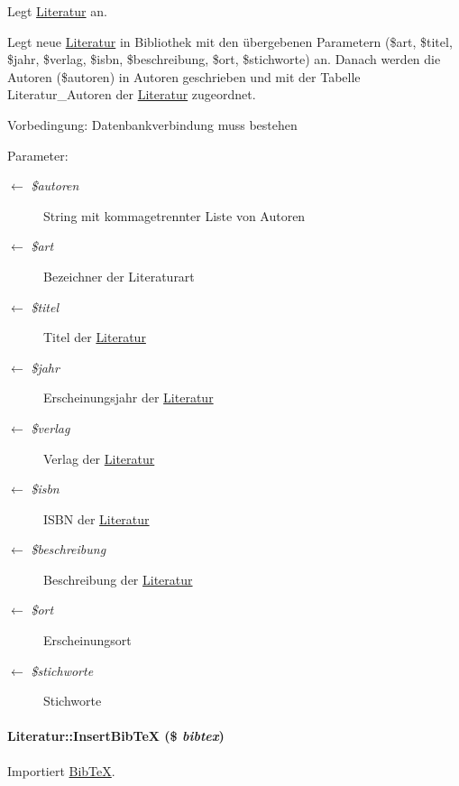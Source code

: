 Legt \hyperlink{classLiteratur}{Literatur} an. 

Legt neue \hyperlink{classLiteratur}{Literatur} in Bibliothek mit den übergebenen Parametern (\$art, \$titel, \$jahr, \$verlag, \$isbn, \$beschreibung, \$ort, \$stichworte) an. Danach werden die Autoren (\$autoren) in Autoren geschrieben und mit der Tabelle Literatur\_\-Autoren der \hyperlink{classLiteratur}{Literatur} zugeordnet. \begin{Desc}
\item[Vorbedingung:]Datenbankverbindung muss bestehen \end{Desc}
\begin{Desc}
\item[Parameter:]
\begin{description}
\item[\mbox{$\leftarrow$} {\em \$autoren}]String mit kommagetrennter Liste von Autoren \item[\mbox{$\leftarrow$} {\em \$art}]Bezeichner der Literaturart \item[\mbox{$\leftarrow$} {\em \$titel}]Titel der \hyperlink{classLiteratur}{Literatur} \item[\mbox{$\leftarrow$} {\em \$jahr}]Erscheinungsjahr der \hyperlink{classLiteratur}{Literatur} \item[\mbox{$\leftarrow$} {\em \$verlag}]Verlag der \hyperlink{classLiteratur}{Literatur} \item[\mbox{$\leftarrow$} {\em \$isbn}]ISBN der \hyperlink{classLiteratur}{Literatur} \item[\mbox{$\leftarrow$} {\em \$beschreibung}]Beschreibung der \hyperlink{classLiteratur}{Literatur} \item[\mbox{$\leftarrow$} {\em \$ort}]Erscheinungsort \item[\mbox{$\leftarrow$} {\em \$stichworte}]Stichworte\end{description}
\end{Desc}
\hypertarget{classLiteratur_d466a307b1971ee736e1d4ba9342dc55}{
\paragraph[InsertBibTeX]{\setlength{\rightskip}{0pt plus 5cm}Literatur::Insert\-Bib\-Te\-X (\$ {\em bibtex})}\hfill}
\label{classLiteratur_d466a307b1971ee736e1d4ba9342dc55}


Importiert \hyperlink{classBibTeX}{Bib\-Te\-X}. 

